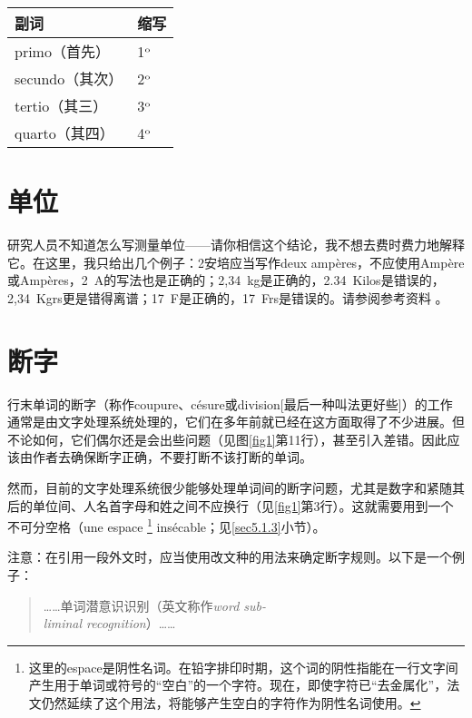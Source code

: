 \begin{center}
    \begin{tabular}{|l|l|}
        \hline
        副词 & 缩写\\
        \hline
        primo（首先） & 1$^{\rm o}$ \\
        secundo（其次） & 2$^{\rm o}$ \\
        tertio（其三） & 3$^{\rm o}$ \\
        quarto（其四） & 4$^{\rm o}$ \\
        \hline
    \end{tabular}
    
\end{center}

\section{单位}

研究人员不知道怎么写测量单位——请你相信这个结论，我不想去费时费力地解释它。在这里，我只给出几个例子：2安培应当写作deux ampères，不应使用Ampère或Ampères，2~A的写法也是正确的；2,34~kg是正确的，2.34~Kilos是错误的，2,34~Kgrs更是错得离谱；17~F是正确的，17~Frs是错误的。请参阅参考资料%
。

\section{断字}

行末单词的断字（称作coupure、césure或division[最后一种叫法更好些]）的工作通常是由文字处理系统处理的，它们在多年前就已经在这方面取得了不少进展。但不论如何，它们偶尔还是会出些问题（见图\ref{fig1}第11行），甚至引入差错。因此应该由作者去确保断字正确，不要打断不该打断的单词。

然而，目前的文字处理系统很少能够处理单词间的断字问题，尤其是数字和紧随其后的单位间、人名首字母和姓之间不应换行（见\ref{fig1}第3行）。这就需要用到一个不可分空格（une espace
    \footnote{这里的espace是阴性名词。在铅字排印时期，这个词的阴性指能在一行文字间产生用于单词或符号的``空白''的一个字符。现在，即使字符已``去金属化''，法文仍然延续了这个用法，将能够产生空白的字符作为阴性名词使用。}
insécable；见\ref{sec5.1.3}小节）。

注意：在引用一段外文时，应当使用改文种的用法来确定断字规则。以下是一个例子：

\begin{quote}
    ……单词潜意识识别（英文称作\emph{word sub-\\
    liminal recognition}）……
\end{quote}


